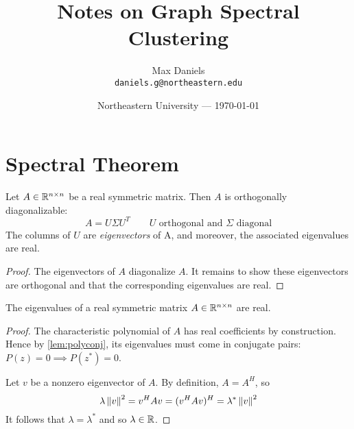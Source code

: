 \documentclass{article}
\title{Notes on Graph Spectral Clustering}
\author{Max Daniels\\ \texttt{daniels.g@northeastern.edu}}
\date{Northeastern University --- \today}
\begin{document}
\maketitle 

\section{Spectral Theorem}
\begin{theorem}
Let $A \in {\mathbb R}^{n \times n}$ be a real symmetric matrix. Then $A$ is orthogonally diagonalizable:
\begin{equation}
    A = U \Sigma U^T \qquad U \text{ orthogonal and } \Sigma \text{ diagonal}
\end{equation}
The columns of $U$ are \textit{eigenvectors} of A, and moreover, the associated eigenvalues are real.
\end{theorem}

\begin{proof}
The eigenvectors of $A$ diagonalize $A$. It remains to show these eigenvectors are orthogonal and that the corresponding eigenvalues are real.
\end{proof}

\begin{theorem}
The eigenvalues of a real symmetric matrix $A \in {\mathbb R}^{n \times n}$ are real.
\end{theorem}
\begin{proof}
The characteristic polynomial of $A$ has real coefficients by construction. Hence by \eqref{lem:polyconj}, its eigenvalues must come in conjugate pairs: $P(z) = 0 \implies P(z^*) = 0$.

Let $v$ be a nonzero eigenvector of $A$. By definition, $A = A^H$, so 
\begin{equation}
    \lambda \left\lVert v\right\rVert^2 = v^H A v = (v^H A v)^H = \lambda^* \left\lVert v\right\rVert^2
\end{equation}
It follows that $\lambda = \lambda^*$ and so $\lambda \in {\mathbb R}$.
\end{proof}
\end{document}
